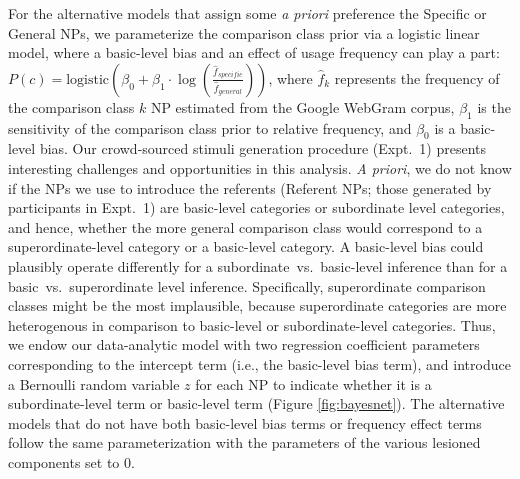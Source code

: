 \documentclass[doc]{apa6}
\begin{document}
For the alternative models that assign some \emph{a priori} preference the Specific or General NPs, we parameterize the comparison class prior via a logistic linear model, where a basic-level bias and an effect of usage frequency can play a part: $P(c) = \text{logistic}(\beta_0 + \beta_1 \cdot \log (\frac{\hat{f}_{specific}}{\hat{f}_{general}}) )$, where $\hat{f}_k$  represents the frequency of the comparison class  $k$ NP estimated from the Google WebGram corpus, $\beta_1$ is the sensitivity of the comparison class prior to relative frequency, and $\beta_0$ is a basic-level bias.
Our crowd-sourced stimuli generation procedure (Expt.~1) presents interesting challenges and opportunities in this analysis. 
\emph{A priori}, we do not know if the NPs we use to introduce the referents (Referent NPs; those generated by participants in Expt.~1) are basic-level categories or subordinate level categories, and hence, whether the more general comparison class would correspond to a superordinate-level category or a basic-level category.
A basic-level bias could plausibly operate differently for a subordinate~vs.~basic-level inference than for a basic~vs.~superordinate level inference. 
Specifically, superordinate comparison classes might be the most implausible, because superordinate categories are more heterogenous in comparison to basic-level or subordinate-level categories.
Thus, we endow our data-analytic model with two regression coefficient parameters corresponding to the intercept term (i.e., the basic-level bias term), and introduce a Bernoulli random variable $z$ for each NP to indicate whether it is a subordinate-level term or basic-level term (Figure \ref{fig:bayesnet}).
The alternative models that do not have both basic-level bias terms or frequency effect terms follow the same parameterization with the parameters of the various lesioned components set to 0. %
\end{document}
